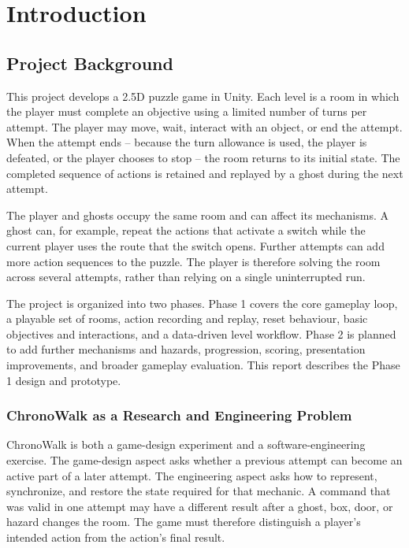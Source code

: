 \section{Introduction}

\subsection{Project Background}

This project develops a 2.5D puzzle game in Unity. Each level is a room in which the player must complete an objective using a limited number of turns per attempt. The player may move, wait, interact with an object, or end the attempt. When the attempt ends -- because the turn allowance is used, the player is defeated, or the player chooses to stop -- the room returns to its initial state. The completed sequence of actions is retained and replayed by a ghost during the next attempt.

The player and ghosts occupy the same room and can affect its mechanisms. A ghost can, for example, repeat the actions that activate a switch while the current player uses the route that the switch opens. Further attempts can add more action sequences to the puzzle. The player is therefore solving the room across several attempts, rather than relying on a single uninterrupted run.

The project is organized into two phases. Phase 1 covers the core gameplay loop, a playable set of rooms, action recording and replay, reset behaviour, basic objectives and interactions, and a data-driven level workflow. Phase 2 is planned to add further mechanisms and hazards, progression, scoring, presentation improvements, and broader gameplay evaluation. This report describes the Phase 1 design and prototype.

\subsubsection{ChronoWalk as a Research and Engineering Problem}

ChronoWalk is both a game-design experiment and a software-engineering exercise. The game-design aspect asks whether a previous attempt can become an active part of a later attempt. The engineering aspect asks how to represent, synchronize, and restore the state required for that mechanic. A command that was valid in one attempt may have a different result after a ghost, box, door, or hazard changes the room. The game must therefore distinguish a player's intended action from the action's final result.

